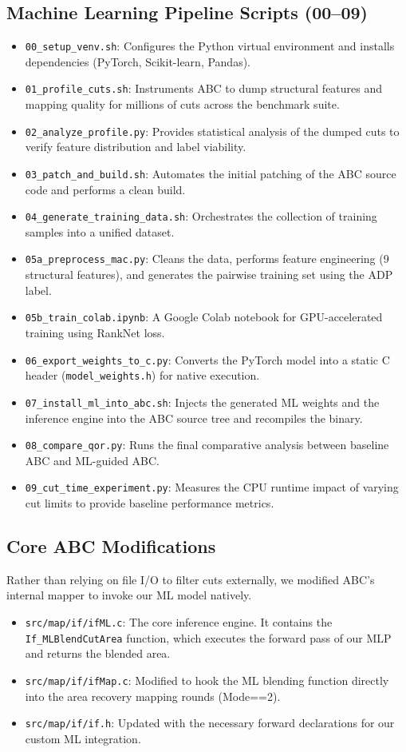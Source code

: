 \documentclass[11pt,a4paper]{article}
\begin{document}
\subsection{Machine Learning Pipeline Scripts (00--09)}
\begin{itemize}
    \item \texttt{00\_setup\_venv.sh}: Configures the Python virtual environment and installs dependencies (PyTorch, Scikit-learn, Pandas).
    \item \texttt{01\_profile\_cuts.sh}: Instruments ABC to dump structural features and mapping quality for millions of cuts across the benchmark suite.
    \item \texttt{02\_analyze\_profile.py}: Provides statistical analysis of the dumped cuts to verify feature distribution and label viability.
    \item \texttt{03\_patch\_and\_build.sh}: Automates the initial patching of the ABC source code and performs a clean build.
    \item \texttt{04\_generate\_training\_data.sh}: Orchestrates the collection of training samples into a unified dataset.
    \item \texttt{05a\_preprocess\_mac.py}: Cleans the data, performs feature engineering (9 structural features), and generates the pairwise training set using the ADP label.
    \item \texttt{05b\_train\_colab.ipynb}: A Google Colab notebook for GPU-accelerated training using RankNet loss.
    \item \texttt{06\_export\_weights\_to\_c.py}: Converts the PyTorch model into a static C header (\texttt{model\_weights.h}) for native execution.
    \item \texttt{07\_install\_ml\_into\_abc.sh}: Injects the generated ML weights and the inference engine into the ABC source tree and recompiles the binary.
    \item \texttt{08\_compare\_qor.py}: Runs the final comparative analysis between baseline ABC and ML-guided ABC.
    \item \texttt{09\_cut\_time\_experiment.py}: Measures the CPU runtime impact of varying cut limits to provide baseline performance metrics.
\end{itemize}

\subsection{Core ABC Modifications}
Rather than relying on file I/O to filter cuts externally, we modified ABC's internal mapper to invoke our ML model natively.
\begin{itemize}
    \item \texttt{src/map/if/ifML.c}: The core inference engine. It contains the \texttt{If\_MLBlendCutArea} function, which executes the forward pass of our MLP and returns the blended area.
    \item \texttt{src/map/if/ifMap.c}: Modified to hook the ML blending function directly into the area recovery mapping rounds (Mode==2).
    \item \texttt{src/map/if/if.h}: Updated with the necessary forward declarations for our custom ML integration.
\end{itemize}
\end{document}
